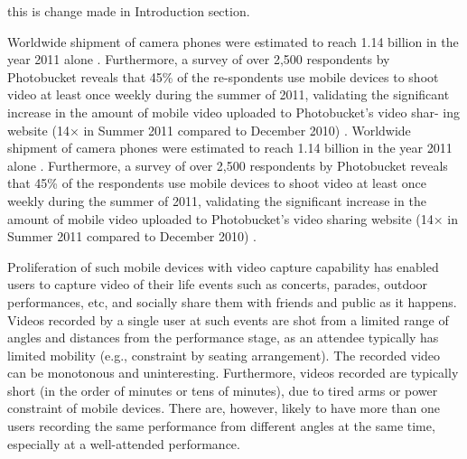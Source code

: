 \documentclass{new}
\begin{document}
%
%
this is change made in Introduction section.

Worldwide shipment of camera phones were estimated to reach
1.14 billion in the year 2011 alone \cite{1}. Furthermore, a survey of
over 2,500 respondents by Photobucket reveals that 45\% of the re-spondents use mobile devices to shoot video at least once weekly
during the summer of 2011, validating the significant increase in
the amount of mobile video uploaded to Photobucket’s video shar-
ing website (14× in Summer 2011 compared to December 2010) \cite{2}.
Worldwide shipment of camera phones were estimated to reach 1.14 billion in the year 2011 alone \cite{1}. Furthermore, a survey of over 2,500 respondents by Photobucket reveals that 45\% of the respondents use mobile devices to shoot video at least once weekly during the summer of 2011, validating the significant increase in the amount of mobile video uploaded to Photobucket’s video sharing website (14× in Summer 2011 compared to December 2010) \cite{2}. 

Proliferation of such mobile devices with video capture capability has enabled users to capture video of their life events such as concerts, parades, outdoor performances, etc, and socially share them with friends and public as it happens. Videos recorded by a single user at such events are shot from a limited range of angles and distances from the performance stage, as an attendee typically has limited mobility (e.g., constraint by seating arrangement). The recorded video can be monotonous and uninteresting. Furthermore, videos recorded are typically short (in the order of minutes or tens of minutes), due to tired arms or power constraint of mobile devices. There are, however, likely to have more than one users recording the same performance from different angles at the same time, especially at a well-attended performance. 
\end{document}
